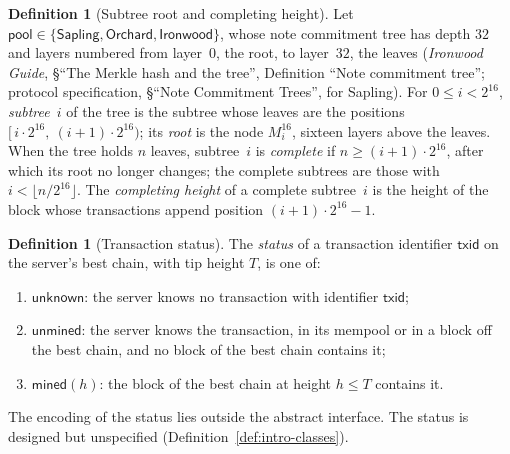\documentclass[11pt,a4paper]{article}
\theoremstyle{definition}
\newtheorem{definition}[theorem]{Definition}
\begin{document}
\begin{definition}[Subtree root and completing height]%
\label{def:service-subtree}
Let $\mathsf{pool} \in \{\mathsf{Sapling}, \mathsf{Orchard},
\mathsf{Ironwood}\}$, whose note commitment tree has depth $32$ and layers
numbered from layer~$0$, the root, to layer~$32$, the leaves
(\emph{Ironwood Guide}, \S``The Merkle hash and the tree'', Definition ``Note
commitment tree''; protocol specification, \S``Note Commitment Trees'', for
Sapling). For $0 \le i < 2^{16}$, \emph{subtree}~$i$ of the tree is the subtree
whose leaves are the positions $[\,i \cdot 2^{16},\ (i+1) \cdot 2^{16})$; its
\emph{root} is the node $M^{16}_i$, sixteen layers above the leaves. When the
tree holds $n$ leaves, subtree~$i$ is \emph{complete} if $n \ge (i+1) \cdot
2^{16}$, after which its root no longer changes; the complete subtrees are those
with $i < \lfloor n / 2^{16} \rfloor$. The \emph{completing height} of a
complete subtree~$i$ is the height of the block whose transactions append
position $(i+1) \cdot 2^{16} - 1$.
\end{definition}

\begin{definition}[Transaction status]\label{def:service-status}
The \emph{status} of a transaction identifier $\mathsf{txid}$ on the
server's best chain, with tip height $T$, is one of:
\begin{enumerate}
\item $\mathsf{unknown}$: the server knows no transaction with identifier
  $\mathsf{txid}$;
\item $\mathsf{unmined}$: the server knows the transaction, in its mempool or
  in a block off the best chain, and no block of the best chain contains it;
\item $\mathsf{mined}(h)$: the block of the best chain at height $h \le T$
  contains it.
\end{enumerate}
The encoding of the status lies outside the abstract interface. The status
is designed but unspecified (Definition~\ref{def:intro-classes}).
\end{definition}
\end{document}
